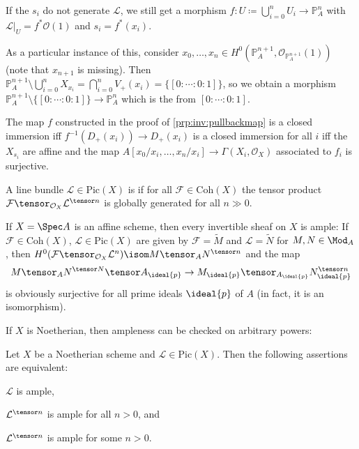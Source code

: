 \documentclass[wip, algebra]{bsteffan-lecturenotes}
\newcommand{\cO}{\mathcal{O}}
\newcommand{\cF}{\mathcal{F}}
\newcommand{\cL}{\mathcal{L}}
\renewcommand{\P}{\mathbb{P}}
\newcommand{\Pic}{\mathrm{Pic}}
\newcommand{\Coh}{\mathrm{Coh}}
\begin{document}
\begin{remark}
	If the $s_i$ do not generate $\cL$, we still get a morphism $f\colon U \coloneq \bigcup_{i = 0}^n U_i \to \P^n_A$ with $\cL|_U = f^* \cO(1)$ and $s_i = f^*(x_i)$.

	As a particular instance of this, consider $x_0, \ldots, x_n \in H^0(\P^{n + 1}_A, \cO_{\P^{n + 1}_A}(1))$ (note that $x_{n + 1}$ is missing).
	Then $\P^{n + 1}_A \setminus \bigcup_{i = 0}^n X_{x_i} = \bigcap_{i = 0}^n V_+(x_i) = \{[0 : \cdots : 0 : 1]\}$, so we obtain a morphism $\P^{n + 1}_A \setminus \{[0 : \cdots : 0 : 1]\} \to \P^n_A$ which is the  from $[0 : \cdots : 0 : 1]$.
\end{remark}
\begin{remark}
	The map $f$ constructed in the proof of \cref{prp:inv:pullbackmap} is a closed immersion iff $f^{-1}(D_+(x_i)) \to D_+(x_i)$ is a closed immersion for all $i$ iff the $X_{s_i}$ are affine and the map $A[x_0 / x_i, \ldots, x_n / x_i] \to \Gamma(X_i, \cO_X)$ associated to $f_i$ is surjective.
\end{remark}
\begin{definition}
	A line bundle $\cL \in \Pic(X)$ is  if for all $\cF \in \Coh(X)$ the tensor product $\cF \tensor_{\cO_X} \cL^{\tensor n}$ is globally generated for all $n \gg 0$.
\end{definition}
\begin{example}
	If $X = \Spec A$ is an affine scheme, then every invertible sheaf on $X$ is ample:
	If $\cF \in \Coh(X)$, $\cL \in \Pic(X)$ are given by $\cF = \widetilde{M}$ and $\cL = \widetilde{N}$ for $M, N \in \Mod_A$, then $H^0(\cF \tensor_{\cO_X} \cL^n) \isom M \tensor_A N^{\tensor n}$ and the map 
	\begin{equation*}
		M \tensor_A N^{\tensor N} \tensor A_{\ideal{p}} \to M_{\ideal{p}} \tensor_{A_{\ideal{p}}} N_{\ideal{p}}^{\tensor n}
	\end{equation*}
	is obviously surjective for all prime ideals $\ideal{p}$ of $A$ (in fact, it is an isomorphism).
\end{example}
If $X$ is Noetherian, then ampleness can be checked on arbitrary powers:
\begin{proposition}\label{prp:inv:amplechar}
	Let $X$ be a Noetherian scheme and $\cL \in \Pic(X)$.
	Then the following assertions are equivalent:
	\begin{alphanumerate}
		\item\label{en:inv:ample1} $\cL$ is ample, 
		\item\label{en:inv:ample2} $\cL^{\tensor n}$ is ample for all $n > 0$, and
		\item\label{en:inv:ample3} $\cL^{\tensor n}$ is ample for some $n > 0$.
	\end{alphanumerate}
\end{proposition}
\end{document}
